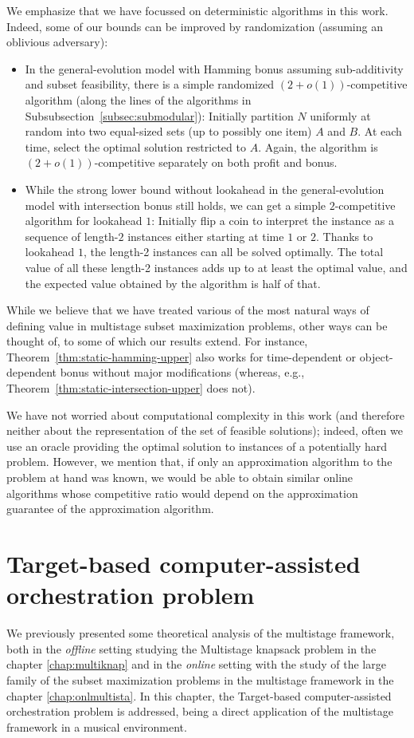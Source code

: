 \documentclass[a4paper]{book}
\newcommand{\finalversion}[1]{#1}
\begin{document}
We emphasize that we have focussed on deterministic algorithms in this work. Indeed, some of our bounds can be improved by randomization (assuming an oblivious adversary):
\begin{itemize}
    \item In the general-evolution model with Hamming bonus assuming \finalversion{sub-additivity} and subset feasibility, there is a simple randomized $(2+o(1))$-competitive algorithm (along the lines of the algorithms in Subsubsection~\ref{subsec:submodular}): Initially partition $N$ uniformly at random into two equal-sized sets (up to possibly one item) $A$ and $B$. At each time, select the optimal solution restricted to $A$. Again, the algorithm is $(2+o(1))$-competitive separately on both profit and bonus.
    \item While the strong lower bound without lookahead in the general-evolution model with intersection bonus still holds, we can get a simple $2$-competitive algorithm for lookahead $1$: Initially flip a coin to interpret the instance as a sequence of length-$2$ instances either starting at time $1$ or $2$. Thanks to lookahead $1$, the length-2 instances can all be solved optimally. The total value of all these length-2 instances adds up to at least the optimal value, and the expected value obtained by the algorithm is half of that.
\end{itemize}

While we believe that we have treated various of the most natural ways of defining value in multistage subset maximization problems, other ways can be thought of, to some of which our results extend. For instance, Theorem~\ref{thm:static-hamming-upper} also works for time-dependent or object-dependent bonus without major modifications (whereas, e.g., Theorem~\ref{thm:static-intersection-upper} does not).

We have not worried about computational complexity in this work (and therefore neither about the representation of the set of feasible solutions); indeed, often we use an oracle providing the optimal solution to instances of a potentially hard problem. However, we mention that, if only an approximation algorithm to the problem at hand was known, we would be able to obtain similar online algorithms whose competitive ratio would depend on the approximation guarantee of the approximation algorithm.

\chapter{Target-based computer-assisted orchestration problem}
We previously presented some theoretical analysis of the multistage framework, both in the \textit{offline} setting studying the {\sc Multistage knapsack} problem in the chapter \ref{chap:multiknap} and in the \textit{online} setting with the study of the large family of the subset maximization problems in the multistage framework in the chapter \ref{chap:onlmultista}. In this chapter, the {\sc Target-based computer-assisted orchestration} problem is addressed, being a direct application of the multistage framework in a musical environment.
\end{document}
